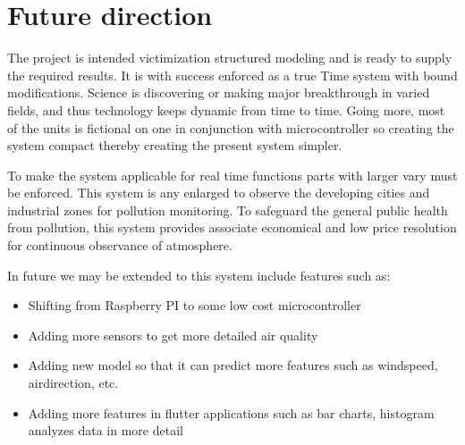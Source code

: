 \section{Future direction}
The project is intended victimization structured modeling and is ready to supply the
required results. It is with success enforced as a true Time system with bound
modifications. Science is discovering or making major breakthrough in varied fields, and thus technology keeps dynamic from time to time. Going more, most of the units is fictional on one in conjunction with microcontroller so creating the system compact thereby creating the present system simpler.

To make the system applicable for real time functions parts with larger vary must be
enforced. This system is any enlarged to observe the developing cities and industrial zones for pollution monitoring. To safeguard the general public health from pollution, this system provides associate economical and low price resolution for continuous observance of atmosphere.

In future we may be extended to this system include features such as:
\begin{itemize}
\item Shifting from Raspberry PI to some low cost microcontroller
\item Adding more sensors to get more detailed air quality
\item Adding new model so that it can predict more features such as windspeed, airdirection, etc.
\item Adding more features in flutter applications such as bar charts, histogram analyzes data in more detail
\end{itemize}


